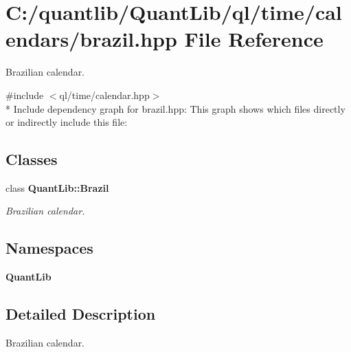 \section{C\+:/quantlib/\+Quant\+Lib/ql/time/calendars/brazil.hpp File Reference}
\label{brazil_8hpp}


Brazilian calendar.  


{\ttfamily \#include $<$ql/time/calendar.\+hpp$>$}\\*
Include dependency graph for brazil.\+hpp\+:
This graph shows which files directly or indirectly include this file\+:
\subsection*{Classes}
\begin{DoxyCompactItemize}
\item 
class {\bf Quant\+Lib\+::\+Brazil}
\begin{DoxyCompactList}\small\item\em Brazilian calendar. \end{DoxyCompactList}\end{DoxyCompactItemize}
\subsection*{Namespaces}
\begin{DoxyCompactItemize}
\item 
 {\bf Quant\+Lib}
\end{DoxyCompactItemize}


\subsection{Detailed Description}
Brazilian calendar. 

